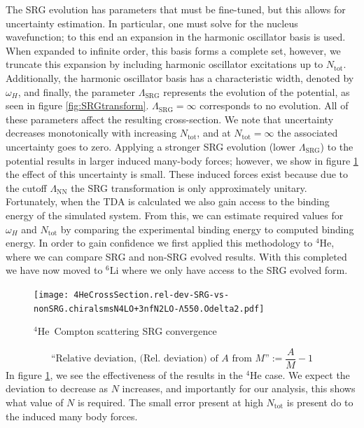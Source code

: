 \documentclass[a4paper,11pt]{article}
\newcommand{\Ntot}{N_{\mathrm{tot}}}
\newcommand{\LamSRG}{\Lambda_{\mathrm{SRG}}}
\newcommand{\LamNN}{\Lambda_{\mathrm{NN}}}
\newcommand{\LiS}{{}^{6} \mathrm{Li} }
\newcommand{\HeF}{{}^{4} \mathrm{He}}
\begin{document}
The SRG evolution has parameters that must be fine-tuned, but this
allows for uncertainty estimation.
In particular, one must solve for the nucleus wavefunction; 
to this end an expansion in the harmonic oscillator basis is used.
When expanded to infinite order, this basis forms a complete set,
however, we truncate this expansion by including harmonic oscillator excitations up to $\Ntot$.
Additionally, the harmonic oscillator basis has a characteristic
width, denoted by $\omega_H$, and finally, the parameter $\LamSRG$
represents the evolution of the potential, as seen in figure
\ref{fig:SRGtransform}. $\LamSRG=\infty$ corresponds to no evolution.
All of these parameters affect the resulting cross-section.
We note that uncertainty decreases monotonically with increasing
$\Ntot$, and at $\Ntot=\infty$ the associated uncertainty goes to zero.
Applying a stronger SRG evolution (lower $\LamSRG$) to the potential results in larger
induced many-body forces; however, we show in figure \ref{fig:SRGConverge4He} the
effect of this uncertainty is small.
These induced forces exist because due to the cutoff $\LamNN$ the SRG transformation
is only approximately unitary.
Fortunately, when the TDA is calculated we also gain access to the
binding energy of the simulated system.
From this, we can estimate required values for $\omega_H$ and
$\Ntot$ by comparing the experimental binding energy to computed
binding energy.
In order to gain confidence we first applied this methodology 
to $\HeF$, where we can compare SRG and non-SRG evolved results. 
With this completed we have now moved to $\LiS$ where we only have access to 
the SRG evolved form.
\begin{figure}[H]
  \begin{center}
    \texttt{[image: 
    4HeCrossSection.rel-dev-SRG-vs-nonSRG.chiralsmsN4LO+3nfN2LO-Λ550.Odelta2.pdf]}
    \caption{$\HeF$\, Compton scattering SRG convergence}
    \label{fig:SRGConverge4He}
  \end{center}
\end{figure}
\begin{equation}
  \text{``Relative deviation, (Rel. deviation) of $A$ from $M$''}:=
  \frac{A}{M}-1
\end{equation}
In figure \ref{fig:SRGConverge4He}, we see the effectiveness of the
results in the $\HeF$ case.
We expect the deviation to decrease as $N$ increases, and importantly
for our analysis, this shows what value of $N$ is required.
The small error present at high $\Ntot$ is present do to the induced many body forces.
\end{document}
